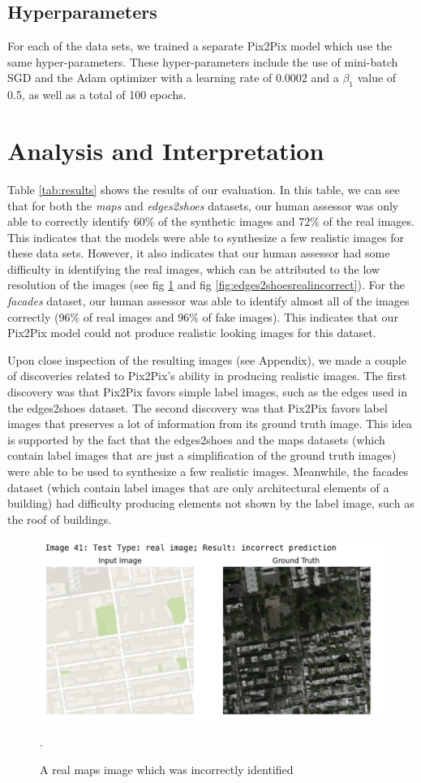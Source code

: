 \documentclass[peerreview]{IEEEtran}
\begin{document}
\subsection{Hyperparameters}
For each of the data sets, we trained a separate Pix2Pix model which use the same hyper-parameters. These hyper-parameters include the use of mini-batch SGD and the Adam optimizer with a learning rate of 0.0002 and a $\beta_1$ value of 0.5, as well as a total of 100 epochs.

\section{Analysis and Interpretation}
Table \ref{tab:results} shows the results of our evaluation. In this table, we can see that for both the \textit{maps} and \textit{edges2shoes} datasets, our human assessor was only able to correctly identify 60\% of the synthetic images and 72\% of the real images. This indicates that the models were able to synthesize a few realistic images for these data sets. However, it also indicates that our human assessor had some difficulty in identifying the real images, which can be attributed to the low resolution of the images (see fig \ref{fig:mapsrealincorrect} and fig \ref{fig:edges2shoesrealincorrect}). For the \textit{facades} dataset, our human assessor was able to identify almost all of the images correctly (96\% of real images and 96\% of fake images). This indicates that our Pix2Pix model could not produce realistic looking images for this dataset. 

Upon close inspection of the resulting images (see Appendix), we made a couple of discoveries related to Pix2Pix's ability in producing realistic images. The first discovery was that Pix2Pix favors simple label images, such as the edges used in the edges2shoes dataset. The second discovery was that Pix2Pix favors label images that preserves a lot of information from its ground truth image. This idea is supported by the fact that the edges2shoes and the maps datasets (which contain label images that are just a simplification of the ground truth images) were able to be used to synthesize a few realistic images. Meanwhile, the facades dataset (which contain label images that are only architectural elements of a building) had difficulty producing elements not shown by the label image, such as the roof of buildings.

\begin{figure}[t]
\centering
\includegraphics[width=0.8\columnwidth]{Maps real incorrect.png} 
\caption{A real maps image which was incorrectly identified}.
\label{fig:mapsrealincorrect}
\end{figure}
\end{document}
